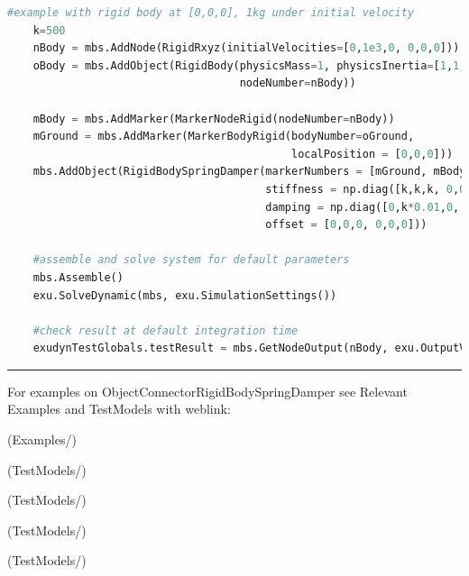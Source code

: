 \begin{lstlisting}[language=Python, firstnumber=1]
    #example with rigid body at [0,0,0], 1kg under initial velocity
    k=500
    nBody = mbs.AddNode(RigidRxyz(initialVelocities=[0,1e3,0, 0,0,0]))
    oBody = mbs.AddObject(RigidBody(physicsMass=1, physicsInertia=[1,1,1,0,0,0], 
                                    nodeNumber=nBody))
    
    mBody = mbs.AddMarker(MarkerNodeRigid(nodeNumber=nBody))
    mGround = mbs.AddMarker(MarkerBodyRigid(bodyNumber=oGround, 
                                            localPosition = [0,0,0]))
    mbs.AddObject(RigidBodySpringDamper(markerNumbers = [mGround, mBody], 
                                        stiffness = np.diag([k,k,k, 0,0,0]), 
                                        damping = np.diag([0,k*0.01,0, 0,0,0]), 
                                        offset = [0,0,0, 0,0,0]))
    
    #assemble and solve system for default parameters
    mbs.Assemble()
    exu.SolveDynamic(mbs, exu.SimulationSettings())
    
    #check result at default integration time
    exudynTestGlobals.testResult = mbs.GetNodeOutput(nBody, exu.OutputVariableType.Displacement)[1] 

\end{lstlisting}

\vspace{6pt}\par\noindent\rule{\textwidth}{0.4pt}
%
\noindent For examples on ObjectConnectorRigidBodySpringDamper see Relevant Examples and TestModels with weblink:
\bi
\item {} (Examples/)
\item {} (TestModels/)
\item {} (TestModels/)
\item {} (TestModels/)
\item {} (TestModels/)

